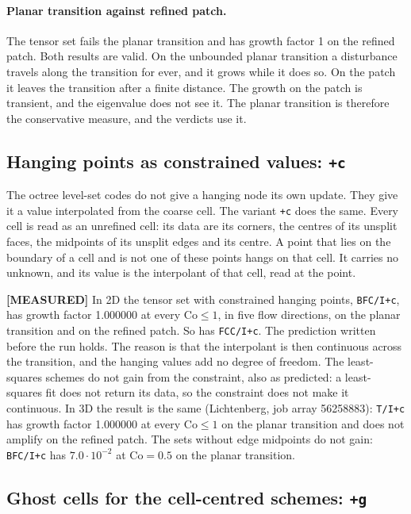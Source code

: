 \documentclass[11pt,a4paper]{article}
\newcommand{\measured}{\textcolor{green!35!black}{\textbf{[MEASURED]}}}
\begin{document}
\paragraph{Planar transition against refined patch.} The tensor set fails the planar
transition and has growth factor 1 on the refined patch. Both results are valid. On the
unbounded planar transition a disturbance travels along the transition for ever, and it
grows while it does so. On the patch it leaves the transition after a finite distance.
The growth on the patch is transient, and the eigenvalue does not see it. The planar
transition is therefore the conservative measure, and the verdicts use it.

\subsection{Hanging points as constrained values: \texttt{+c}}

The octree level-set codes do not give a hanging node its own update. They give it a value
interpolated from the coarse cell. The variant \texttt{+c} does the same. Every cell is
read as an unrefined cell: its data are its corners, the centres of its unsplit faces,
the midpoints of its unsplit edges and its centre. A point that lies on the boundary of a
cell and is not one of these points hangs on that cell. It carries no unknown, and its
value is the interpolant of that cell, read at the point.

\measured{} In 2D the tensor set with constrained hanging points, \texttt{BFC/I+c}, has
growth factor 1.000000 at every $\mathrm{Co} \le 1$, in five flow directions, on the
planar transition and on the refined patch. So has \texttt{FCC/I+c}. The prediction
written before the run holds. The reason is that the interpolant is then continuous
across the transition, and the hanging values add no degree of freedom. The least-squares
schemes do not gain from the constraint, also as predicted: a least-squares fit does not
return its data, so the constraint does not make it continuous. In 3D the result is the same (Lichtenberg, job array 56258883): \texttt{T/I+c} has
growth factor 1.000000 at every $\mathrm{Co} \le 1$ on the planar transition and does
not amplify on the refined patch. The sets without edge midpoints do not gain:
\texttt{BFC/I+c} has $7.0\cdot10^{-2}$ at $\mathrm{Co} = 0.5$ on the planar transition.

\subsection{Ghost cells for the cell-centred schemes: \texttt{+g}}
\end{document}
